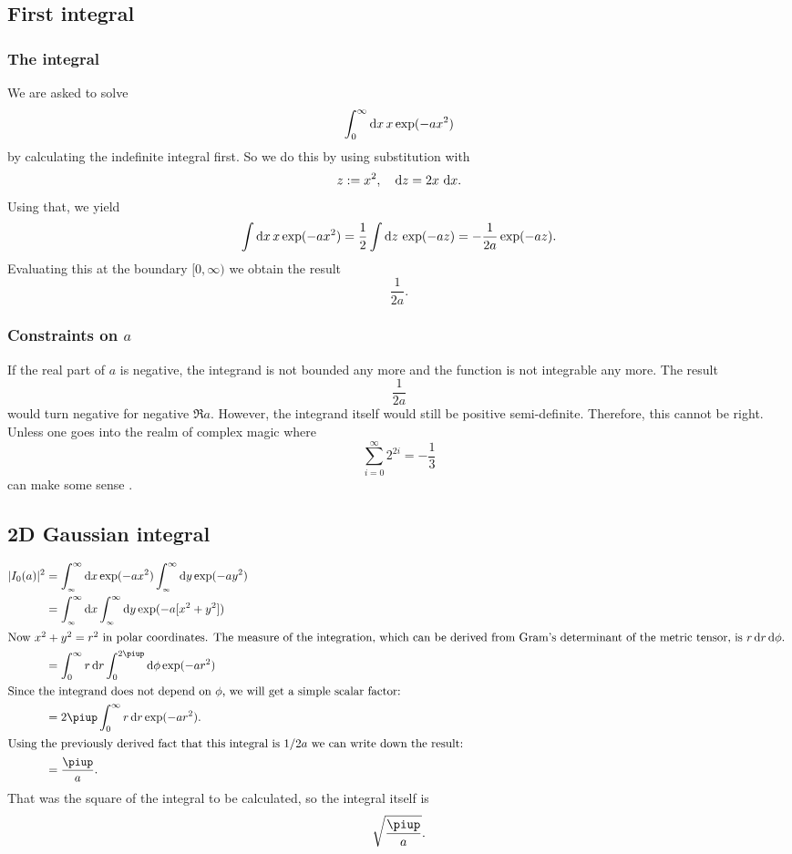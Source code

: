 \documentclass[11pt, english, fleqn, DIV=15, headinclude, BCOR=1cm]{scrartcl}
\begin{document}
\subsection{First integral}

\subsubsection{The integral}

We are asked to solve
\[
    \int_0^\infty \mathop{}\!\mathrm d x \, x \exp(-ax^2)
\]
by calculating the indefinite integral first. So we do this by using
substitution with
\[
    z := x^2
    ,\quad
    \mathop{}\!\mathrm d z = 2 x \, \mathop{}\!\mathrm d x.
\]
Using that, we yield
\[
    \int \mathop{}\!\mathrm d x \, x \exp(-ax^2) = \frac{1}{2} \int \mathop{}\!\mathrm d z \, \exp(-az) = -
    \frac{1}{2a} \exp(-az).
\]
Evaluating this at the boundary $[0, \infty)$ we obtain the result
\[
    \frac{1}{2a}.
\]

\subsubsection{Constraints on $a$}

If the real part of $a$ is negative, the integrand is not bounded any more and
the function is not integrable any more. The result
\[
    \frac{1}{2a}
\]
would turn negative for negative $\Re a$. However, the integrand itself would
still be positive semi-definite. Therefore, this cannot be right. Unless one
goes into the realm of complex magic where
\[
    \sum_{i = 0}^\infty 2^{2i} = - \frac{1}{3}
\]
can make some sense \parencite[78]{penrose-road_to_reality}.

\subsection{2D Gaussian integral}

\begin{align*}
    |I_0(a)|^2
    &=
    \int_{_\infty}^\infty \dif x \exp(-ax^2)
    \int_{_\infty}^\infty \dif y \exp(-ay^2) \\
    &=
    \int_{_\infty}^\infty \dif x \int_{_\infty}^\infty \dif y \exp(-a[x^2+y^2]) \\
    \intertext{%
        Now $x^2 + y^2 = r^2$ in polar coordinates. The measure of the
        integration, which can be derived from Gram's determinant of the
        metric tensor, is $r \dif r \dif \phi$.
    }
    &= \int_0^\infty r \dif r \int_0^{2\piup} \dif \phi \exp(-ar^2) \\
    \intertext{%
        Since the integrand does not depend on $\phi$, we will get a simple
        scalar factor:
    }
    &= 2 \piup \int_0^\infty r \dif r \exp(-ar^2). \\
    \intertext{%
        Using the previously derived fact that this integral is $1/2a$ we can
        write down the result:
    }
    &= \frac{\piup}a.
\end{align*}
That was the square of the integral to be calculated, so the integral itself is
\[
    \sqrt{\frac\piup a}.
\]
\end{document}
